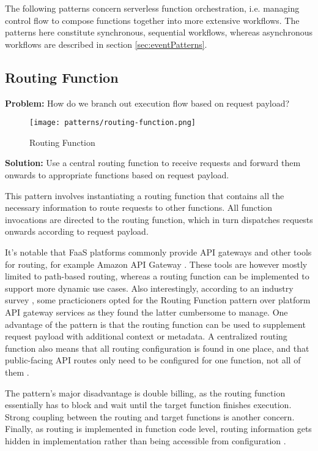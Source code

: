 The following patterns concern serverless function orchestration, i.e. managing control flow to compose functions together into more extensive workflows. The patterns here constitute synchronous, sequential workflows, whereas asynchronous workflows are described in section \ref{sec:eventPatterns}.

\subsection{Routing Function} \label{subsec:routingFunction}

\textbf{Problem:} How do we branch out execution flow based on request payload?

\begin{figure}[h]
  \centering
  \texttt{[image: patterns/routing-function.png]}
  \caption{Routing Function}
  \label{fig:patternRoutingFunction}
\end{figure}

\textbf{Solution:} Use a central routing function to receive requests and forward them onwards to appropriate functions based on request payload.

This pattern involves instantiating a routing function that contains all the necessary information to route requests to other functions. All function invocations are directed to the routing function, which in turn dispatches requests onwards according to request payload.

It's notable that FaaS platforms commonly provide API gateways and other tools for routing, for example Amazon API Gateway \parencite{awslambda0218}. These tools are however mostly limited to path-based routing, whereas a routing function can be implemented to support more dynamic use cases. Also interestingly, according to an industry survey \parencite{leitner18industrialpractice}, some practicioners opted for the Routing Function pattern over platform API gateway services as they found the latter cumbersome to manage. One advantage of the pattern is that the routing function can be used to supplement request payload with additional context or metadata. A centralized routing function also means that all routing configuration is found in one place, and that public-facing API routes only need to be configured for one function, not all of them \parencite{leitner18industrialpractice}.

The pattern's major disadvantage is double billing, as the routing function essentially has to block and wait until the target function finishes execution. Strong coupling between the routing and target functions is another concern. Finally, as routing is implemented in function code level, routing information gets hidden in implementation rather than being accessible from configuration \parencite{leitner18industrialpractice}.


